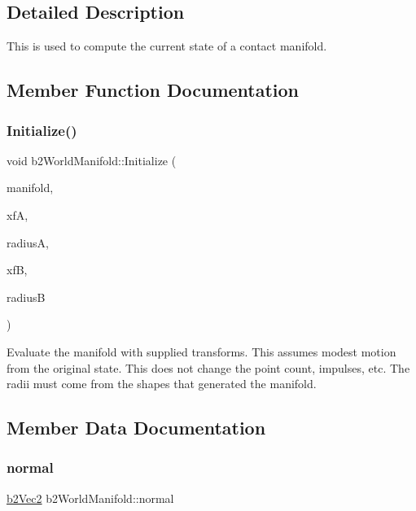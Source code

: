 \subsection{Detailed Description}
This is used to compute the current state of a contact manifold. 

\subsection{Member Function Documentation}
\mbox{\label{structb2_world_manifold_a896dd7e7d4d6f6a5bc69e19fbd6871bd}} 
\subsubsection{\texorpdfstring{Initialize()}{Initialize()}}
{\footnotesize\ttfamily void b2\+World\+Manifold\+::\+Initialize (\begin{DoxyParamCaption}\item[{const \mbox{\hyperlink{structb2_manifold}{b2\+Manifold}} $\ast$}]{manifold,  }\item[{const \mbox{\hyperlink{structb2_transform}{b2\+Transform}} \&}]{xfA,  }\item[{\mbox{\hyperlink{b2_settings_8h_aacdc525d6f7bddb3ae95d5c311bd06a1}{float32}}}]{radiusA,  }\item[{const \mbox{\hyperlink{structb2_transform}{b2\+Transform}} \&}]{xfB,  }\item[{\mbox{\hyperlink{b2_settings_8h_aacdc525d6f7bddb3ae95d5c311bd06a1}{float32}}}]{radiusB }\end{DoxyParamCaption})}

Evaluate the manifold with supplied transforms. This assumes modest motion from the original state. This does not change the point count, impulses, etc. The radii must come from the shapes that generated the manifold. 

\subsection{Member Data Documentation}
\mbox{\label{structb2_world_manifold_acf8de61b73d9784d16f7d0e824ce44bf}} 
\subsubsection{\texorpdfstring{normal}{normal}}
{\footnotesize\ttfamily \mbox{\hyperlink{structb2_vec2}{b2\+Vec2}} b2\+World\+Manifold\+::normal}



